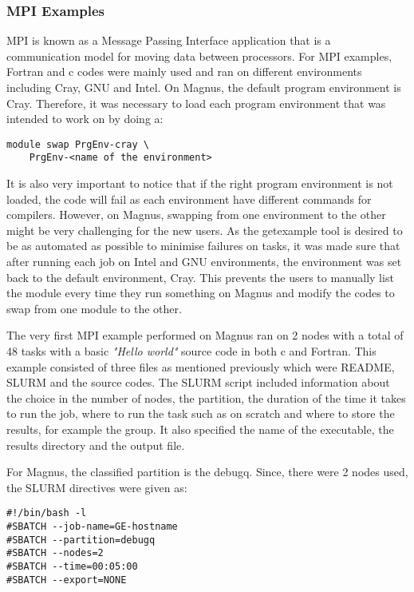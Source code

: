 \subsubsection{MPI Examples}

MPI is known as a Message Passing Interface application that is a communication model for moving data between processors. For MPI examples, Fortran and 
c codes were mainly used and ran on different environments including Cray, GNU and Intel. On Magnus, the default program environment is Cray. Therefore, 
it was necessary to load each program environment that was intended to work on by doing a:

\begin{tcolorbox}
\begin{verbatim}
module swap PrgEnv-cray \
    PrgEnv-<name of the environment>
\end{verbatim}
\end{tcolorbox}

It is also very important to notice that if the right program environment is not loaded, the code will fail as each environment have different commands 
for compilers. However, on Magnus, swapping from one environment to the other might be very challenging for the new users. As the getexample tool is
desired to be as automated as possible to minimise failures on tasks, it was made sure that after running each job on Intel and GNU environments, the
environment was set back to the default environment, Cray. This prevents the users to manually list the module every time they run something on Magnus
and modify the codes to swap from one module to the other. 

The very first MPI example performed on Magnus ran on 2 nodes with a total of 48 tasks with a basic \emph{"Hello world"} source code in both c and Fortran. 
This example consisted of three files as mentioned previously which were README, SLURM and the source codes. The SLURM script included information about
the choice in the number of nodes, the partition, the duration of the time it takes to run the job, where to run the task such as on scratch and where
to store the results, for example the group. It also specified the name of the executable, the results directory and the output file. 

For Magnus, the classified partition is the debugq. Since, there were 2 nodes used, the SLURM directives were given as:

\begin{tcolorbox}
\begin{verbatim}
#!/bin/bash -l
#SBATCH --job-name=GE-hostname
#SBATCH --partition=debugq
#SBATCH --nodes=2
#SBATCH --time=00:05:00
#SBATCH --export=NONE
\end{verbatim}
\end{tcolorbox}

